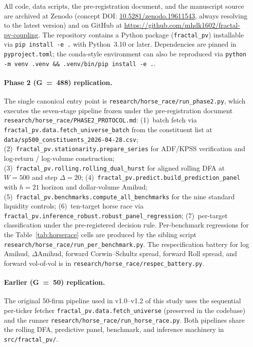 \documentclass[preprint,12pt,authoryear]{elsarticle}
\begin{document}
All code, data scripts, the pre-registration document, and the manuscript source are archived at Zenodo (concept DOI: \href{https://doi.org/10.5281/zenodo.19611543}{10.5281/zenodo.19611543}, always resolving to the latest version) and on GitHub at \url{https://github.com/mhdk1602/fractal-pv-coupling}. The repository contains a Python package (\texttt{fractal\_pv}) installable via \texttt{pip install -e .} with Python~3.10 or later. Dependencies are pinned in \texttt{pyproject.toml}; the conda-style environment can also be reproduced via \texttt{python -m venv .venv \&\& .venv/bin/pip install -e .}.

\paragraph{Phase 2 (G~=~488) replication.} The single canonical entry point is \texttt{research/horse\_race/run\_phase2.py}, which executes the seven-stage pipeline frozen under the pre-registration document \texttt{research/horse\_race/PHASE2\_PROTOCOL.md}: (1)~batch fetch via \texttt{fractal\_pv.data.fetch\_universe\_batch} from the constituent list at \texttt{data/sp500\_constituents\_2026-04-28.csv}; (2)~\texttt{fractal\_pv.stationarity.prepare\_series} for ADF/KPSS verification and log-return / log-volume construction; (3)~\texttt{fractal\_pv.rolling.rolling\_dual\_hurst} for aligned rolling DFA at $W = 500$ and step $\Delta = 20$; (4)~\texttt{fractal\_pv.predict.build\_prediction\_panel} with $h = 21$ horizon and dollar-volume Amihud; (5)~\texttt{fractal\_pv.benchmarks.compute\_all\_benchmarks} for the nine standard liquidity controls; (6)~ten-target horse race via \texttt{fractal\_pv.inference\_robust.robust\_panel\_regression}; (7)~per-target classification under the pre-registered decision rule. Per-benchmark regressions for the Table~\ref{tab:horserace} cells are produced by the sibling script \texttt{research/horse\_race/run\_per\_benchmark.py}. The respecification battery for log Amihud, $\Delta$Amihud, forward Corwin--Schultz spread, forward Roll spread, and forward vol-of-vol is in \texttt{research/horse\_race/respec\_battery.py}.

\paragraph{Earlier (G~=~50) replication.} The original 50-firm pipeline used in v1.0--v1.2 of this study uses the sequential per-ticker fetcher \texttt{fractal\_pv.data.fetch\_universe} (preserved in the codebase) and the runner \texttt{research/horse\_race/run\_horse\_race.py}. Both pipelines share the rolling DFA, predictive panel, benchmark, and inference machinery in \texttt{src/fractal\_pv/}.
\end{document}
